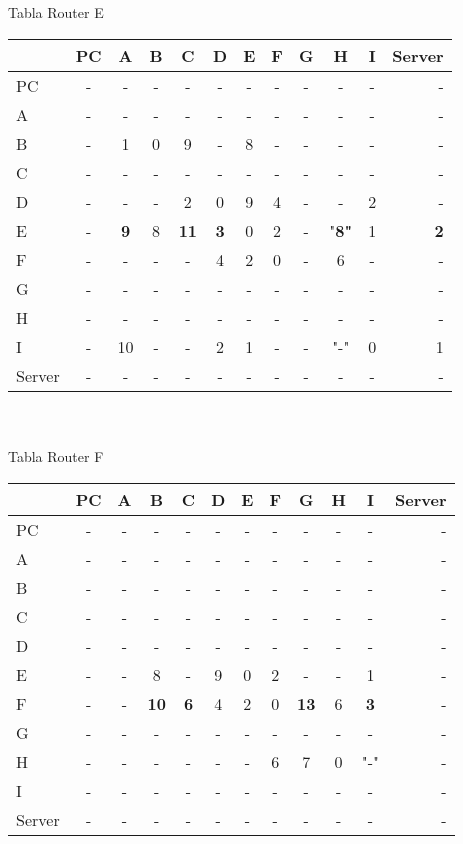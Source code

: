 \documentclass{article}
\begin{document}
\\
\\
Tabla Router E \\
\begin{tabular}{l*{10}{c}r}
              & PC & A & B & C & D & E & F & G & H & I & Server \\
\hline
PC             & - & - & - & - & - & - & - & - & - & - & -\\
A              & - & - & - & - & - & - & - & - & - & - & -\\
B              & - & 1 & 0 & 9 & - & 8 & - & - & - & - & -\\
C              & - & - & - & - & - & - & - & - & - & - & -\\
D              & - & - & - & 2 & 0 & 9 & 4 & - & - & 2 & -\\
E              & - &\bf{9}& 8 &\bf{11}&\bf{3}& 0 & 2 & - &"\bf{8}"& 1 &\bf{2}\\
F              & - & - & - & - & 4 & 2 & 0 & - & 6 & - & -\\
G              & - & - & - & - & - & - & - & - & - & - & -\\
H              & - & - & - & - & - & - & - & - & - & - & -\\
I              & - & 10 & - & - & 2 & 1 & - & - & "-" & 0 & 1\\
Server         & - & - & - & - & - & - & - & - & - & - & -\\

\end{tabular}
\\
\\
Tabla Router F \\
\begin{tabular}{l*{10}{c}r}
              & PC & A & B & C & D & E & F & G & H & I & Server \\
\hline
PC             & - & - & - & - & - & - & - & - & - & - & -\\
A              & - & - & - & - & - & - & - & - & - & - & -\\
B              & - & - & - & - & - & - & - & - & - & - & -\\
C              & - & - & - & - & - & - & - & - & - & - & -\\
D              & - & - & - & - & - & - & - & - & - & - & -\\
E              & - & - & 8 & - & 9 & 0 & 2 & - & - & 1 & -\\
F              & - & - &\bf{10}&\bf{6}& 4 & 2 & 0 &\bf{13}& 6 &\bf{3}& -\\
G              & - & - & - & - & - & - & - & - & - & - & -\\
H              & - & - & - & - & - & - & 6 & 7 & 0 & "-" & -\\
I              & - & - & - & - & - & - & - & - & - & - & -\\
Server         & - & - & - & - & - & - & - & - & - & - & -\\

\end{tabular}
\end{document}
